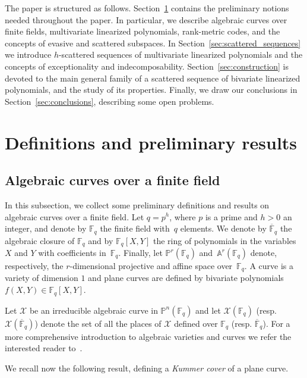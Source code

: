 \documentclass[11pt]{article}
\theoremstyle{definition}
\numberwithin{equation}{section}
\begin{document}
The paper is structured as follows. Section~\ref{sec:preliminaries} contains the preliminary notions needed throughout the paper. In particular, we  describe algebraic curves over finite fields, multivariate linearized polynomials, rank-metric codes, and the concepts of evasive and scattered subspaces. In Section~\ref{sec:scattered_sequences} we introduce $h$-scattered sequences of multivariate linearized polynomials and the concepts of exceptionality and indecomposability. Section~\ref{sec:construction} is devoted to the main general family of a scattered sequence of bivariate linearized polynomials, and the study of its properties. Finally, we draw our conclusions in  Section~\ref{sec:conclusions}, describing some open problems.

\section{Definitions and preliminary results}\label{sec:preliminaries}

\subsection{Algebraic curves over a finite field}\label{sec:curves}

In this subsection, we collect some preliminary definitions and results on algebraic curves over a finite field. Let $q=p^h$, where $p$ is a prime and $h>0$ an integer, and denote by $\mathbb{F}_q$ the finite field with~$q$ elements. We denote by $\overline{\mathbb{F}}_q$ the algebraic closure of $\mathbb{F}_q$ and by $\mathbb{F}_q[X,Y]$ the ring of polynomials in the variables $X$ and $Y$ with coefficients in~$\mathbb{F}_q$. Finally, let $\mathbb{P}^r(\mathbb{F}_q)$ and~$\mathbb{A}^r(\mathbb{F}_q)$ denote, respectively, the $r$-dimensional projective and affine space over~$\mathbb{F}_q$.
A curve is a variety of dimension $1$ and plane curves are defined by bivariate polynomials~$f(X,Y)\in \mathbb{F}_q[X,Y]$.

Let $\mathcal{X}$ be an irreducible algebraic curve in $\mathbb{P}^n(\mathbb{F}_q)$ and
let $\mathcal{X}(\mathbb{F}_q)$ (resp. $\mathcal{X}(\overline{\mathbb{F}}_q)$) denote the set of all the places of $\mathcal{X}$ defined over $\mathbb{F}_q$ (resp. $\overline{\mathbb{F}}_q$). For a more comprehensive introduction to algebraic varieties and curves we refer the interested reader to~\cite{HKT,Hartshorne,Stichtenoth}. 

We recall now the following result, defining a \emph{Kummer cover} of a plane curve.
\end{document}
